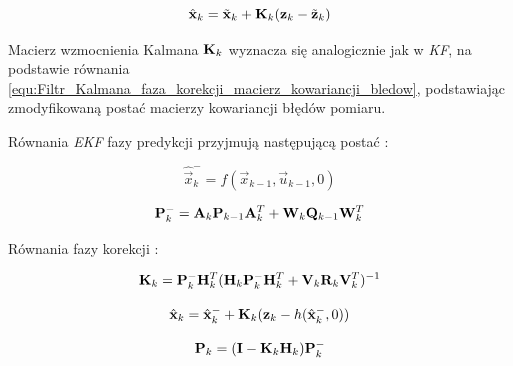 \begin{equation}
\label{equ:Rozszerzony_Filtr_Kalmana_estymacja_stanu_cd}
	\hat{\vec{x}}_k = \tilde{\vec{x}}_k + \matr{K}_k (\vec{z}_k - \tilde{\vec{z}}_k)
\end{equation}

Macierz wzmocnienia Kalmana $\mathbf{K}_k$ wyznacza się analogicznie jak w \textit{KF}, na podstawie równania \ref{equ:Filtr_Kalmana_faza_korekcji_macierz_kowariancji_bledow}, podstawiając zmodyfikowaną postać macierzy kowariancji błędów pomiaru.

Równania \textit{EKF} fazy predykcji przyjmują następującą postać \cite{Welch1995}:

\begin{equation}
\label{equ:Rozszerzony_Filtr_Kalmana_faza_predykcji_stan}
	\hat{\vec{x}}_k^- = f(\vec{x}_{k-1}, \vec{u}_{k-1}, 0)
\end{equation}

\begin{equation}
\label{equ:Rozszerzony_Filtr_Kalmana_faza_predykcji_macierz_kowariancji_bledow}
	\mathbf{P}_k^- = \mathbf{A}_k \mathbf{P}_{k-1} \mathbf{A}_k^T + \mathbf{W}_k\mathbf{Q}_{k-1}\mathbf{W}_k^T
\end{equation}

Równania fazy korekcji \cite{Welch1995}:

\begin{equation}
\label{equ:Rozszerzony_Filtr_Kalmana_faza_korekcji_wzmocnienie}
	\mathbf{K}_k = \mathbf{P}_k^- \mathbf{H}_k^T ( \mathbf{H}_k \mathbf{P}_k^- \mathbf{H}_k^T + \mathbf{V}_k\mathbf{R}_k\mathbf{V}_k^T ) ^ {-1}
\end{equation}

\begin{equation}
\label{equ:Rozszerzony_Filtr_Kalmana_faza_korekcji_stan}
	\hat{\vec{x}}_k = \hat{\vec{x}}_k^- + \matr{K}_k(\vec{z}_k - h(\hat{\vec{x}}_k^-,0))
\end{equation}

\begin{equation}
\label{equ:Rozszerzony_Filtr_Kalmana_faza_korekcji_macierz_kowariancji_bledow}
	\mathbf{P}_k = (\mathbf{I} - \mathbf{K}_k \mathbf{H}_k) \mathbf{P}_k^-
\end{equation}